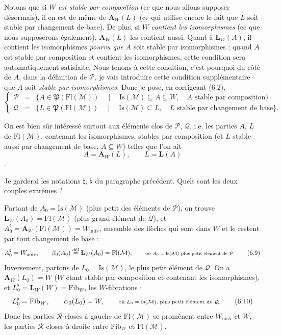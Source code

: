 \documentclass[11pt]{article}
\newcommand{\printedpage}[1]{\marginpar{\footnotesize p.~#1}}
\newcommand{\msp}[1]{\marginpar{\footnotesize [#1]}}
\newcommand{\Fl}{\mathrm{Fl}}
\newcommand{\Pf}{\mathfrak{P}}
\newcommand{\Is}{\mathrm{Is}}
\newcommand{\Fib}{\mathrm{Fib}}
\begin{document}
\msp{page 86}Notons que si $W$ \textit{est stable par composition} (ce que nous allons supposer désormais), il en est de même de $\mathbf{A}_W(L)$ (ce qui utilise encore le fait que $L$ soit stable par changement de base). De plus, si $W$ \textit{contient les isomorphismes} (ce que nous supposerons également), $\mathbf{A}_W(L)$ les contient aussi. Quant à $\mathbf{L}_W(A)$, il contient les isomorphismes \textit{pourvu que} $A$ soit stable par isomorphismes ; quand $A$ est stable par composition et contient les isomorphismes, cette condition sera automatiquement satisfaite. Nous tenons à cette condition, c'est pourquoi du côté de $A$, dans la définition de $\mathcal{P}$, je vais introduire cette condition supplémentaire que $A$ soit \textit{stable par isomorphismes.} Donc je pose, en corrigeant (6.2),
\[
\left\{
\begin{array}{rcl}
\mathcal{P} & = & \{A\in\Pf(\Fl(\mathcal{M}))\quad\mid\quad\mathrm{Is}(\mathcal{M})\subseteq A\subseteq W,\quad A\text{ stable par composition}\}\\[1ex]
\mathcal{Q} & = & \{L\in\Pf(\Fl(\mathcal{M}))\quad\mid\quad\mathrm{Is}(\mathcal{M})\subseteq L,\quad L\text{ stable par changement de base}\}.
\end{array}
\right.
\tag*{(6.7)}
\]

\printedpage{54}
On est bien sûr intéressé surtout aux éléments clos de $\mathcal{P}$, $\mathcal{Q}$, i.e. les parties $A$, $L$ de $\Fl(\mathcal{M})$, contenant les isomorphismes, stables par composition (et $L$ stable aussi par changement de base, $A \subseteq W$) telles que l'on ait
\[
A = \mathbf{A}_W(L), \qquad L = \mathbf{L}(A) \tag*{(6.8)}
\]
.

\msp{page 87}

Je garderai les notations $\natural$, $\flat$ du paragraphe précédent. Quels sont les deux couples extrêmes ?

Partant de $A_0 = \Is(\mathcal{M})$ (plus petit des éléments de $\mathcal{P}$), on trouve $\mathbf{L}_W(A_0) = \Fl(\mathcal{M})$ (plus grand élément de $\mathcal{Q}$), et $A_0^{\natural} = \mathbf{A}_W(\Fl(\mathcal{M})) = W_{\mathrm{univ}}$, ensemble des flèches qui sont dans $W$ et le restent par tout changement de base :
\[
A_0^{\natural} = W_{\mathrm{univ}}, \qquad \beta_0(A_0) \overset{\text{déf}}{=} \mathbf{L}_W(A_0) = \Fl(\mathcal{M}), \qquad \text{\scriptsize où $A_0 = \Is(\mathcal{M})$ plus petit élément de $\mathcal{P}$.} \tag*{(6.9)}
\]
Inversement, partons de $L_0 = \Is(\mathcal{M})$, le plus petit élément de $\mathcal{Q}$. On a $\mathbf{A}_W(L_0) = W$ ($W$ étant stable par composition et contenant les isomorphismes), et $L_0^{\flat} = \mathbf{L}_W(W) = \Fib_W$, les $W$-fibrations :
\[
L_0^{\flat} = \Fib_W, \qquad \alpha_0(L_0) = W, \qquad \text{\scriptsize où $L_0 = \Is(\mathcal{M})$, plus petit élément de $\mathcal{Q}$.} \tag*{(6.10)}
\]
Donc les parties $\mathcal{R}$-closes à gauche de $\Fl(\mathcal{M})$ se promènent entre $W_{\mathrm{univ}}$ et $W$, les parties $\mathcal{R}$-closes à droite entre $\Fib_W$ et $\Fl(\mathcal{M})$.
\end{document}
